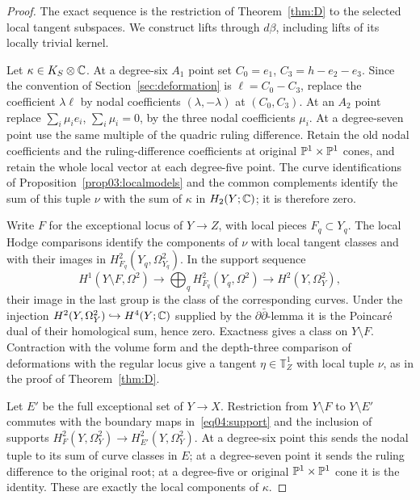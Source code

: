 \begin{proof}
The exact sequence is the restriction of Theorem~\ref{thm:D} to the
selected local tangent subspaces.  We construct lifts through $d\beta$,
including lifts of its locally trivial kernel.

Let $\kappa\in K_S\otimes\mathbb{C}$.  At a degree-six $A_1$ point set
$C_0=e_1$, $C_3=h-e_2-e_3$.  Since the convention of
Section~\ref{sec:deformation} is $\ell=C_0-C_3$, replace the
coefficient $\lambda\ell$ by nodal coefficients
$(\lambda,-\lambda)$ at $(C_0,C_3)$.  At an $A_2$ point replace
$\sum_i\mu_i e_i$, $\sum_i\mu_i=0$, by the three nodal coefficients
$\mu_i$.  At a degree-seven point use the same multiple of the
quadric ruling difference.  Retain the old nodal coefficients and
the ruling-difference coefficients at original $\mathbb{P}^1\times\mathbb{P}^1$
cones, and retain the whole local vector at each degree-five point.  The
curve identifications of Proposition~\ref{prop03:localmodels} and the
common complements identify the sum of this tuple $\nu$ with the
sum of $\kappa$ in $H_2(Y;\mathbb{C})$; it is therefore zero.

Write $F$ for the exceptional locus of $Y\to Z$, with local pieces
$F_q\subset Y_q$.  The local Hodge comparisons identify the components
of $\nu$ with local tangent classes and with their images in
$H^2_{F_q}(Y_q,\Omega^2_{Y_q})$.  In the support sequence
\begin{equation}\label{eq04:support}
 H^1(Y\setminus F,\Omega^2)
 \longrightarrow\bigoplus_q H^2_{F_q}(Y_q,\Omega^2)
 \longrightarrow H^2(Y,\Omega^2_Y),
\end{equation}
their image in the last group is the class of the corresponding
curves.  Under the injection
$H^2(Y,\Omega^2_Y)\hookrightarrow H^4(Y;\mathbb{C})$ supplied by the
$\partial\bar\partial$-lemma it is the Poincar\'e dual of their
homological sum, hence zero.  Exactness gives a class on
$Y\setminus F$.  Contraction with the volume form and the
depth-three comparison of deformations with the regular locus give
a tangent $\eta\in\mathbb T^1_Z$ with local tuple $\nu$, as in the
proof of Theorem~\ref{thm:D}.

Let $E'$ be the full exceptional set of $Y\to X$.  Restriction from
$Y\setminus F$ to $Y\setminus E'$ commutes with the boundary maps
in~\eqref{eq04:support} and the inclusion of supports
$H^2_F(Y,\Omega^2_Y)\to H^2_{E'}(Y,\Omega^2_Y)$.  At a degree-six
point this sends the nodal tuple to its sum of curve classes in $E$;
at a degree-seven point it sends the ruling difference to the original
root; at a degree-five or original $\mathbb{P}^1\times\mathbb{P}^1$ cone
it is the identity.
These are exactly the local components of $\kappa$.


\end{proof}

